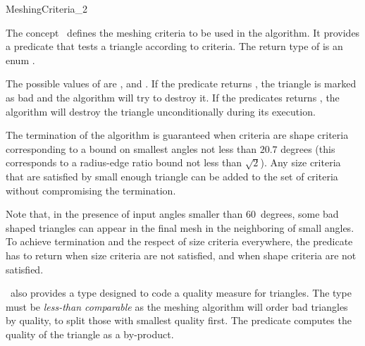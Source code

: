 \begin{ccRefConcept}{MeshingCriteria_2}

\ccDefinition

The concept \ccRefName\ defines the meshing criteria to be used in the
algorithm. It provides a predicate  that tests a triangle
according to criteria. The return type of  is an enum
.

The possible values of  are ,
 and . If the predicate returns ,
the triangle is marked as bad and the algorithm will try to destroy it. If
the predicates returns , the algorithm will destroy
the triangle unconditionally during its execution.

The termination of the algorithm is guaranteed when criteria are shape
criteria corresponding to a bound on smallest angles not less than
$20.7$ degrees (this corresponds to a radius-edge ratio bound not less
than $\sqrt{2}$). Any size criteria that are satisfied by small enough
triangle can be added to the set of criteria without compromising
the termination.

Note that, in the presence of input angles smaller than $60$~degrees,
some bad shaped triangles can appear in the final mesh in the
neighboring of small angles. To achieve termination and the respect of
size criteria everywhere, the  predicate has to return
 when size criteria are not satisfied, and
 when shape criteria are not satisfied.


\ccRefName\ also provides a type  designed to code a quality
measure for triangles.  The type  must be \emph{less-than
  comparable} as the meshing algorithm will order bad triangles by quality,
to split those with smallest quality first. The predicate 
computes the quality of the triangle as a by-product.

\ccTypes



\end{ccRefConcept}
